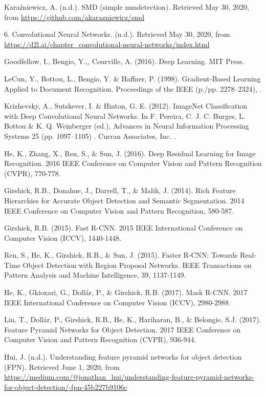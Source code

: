 \begin{thebibliography}{9}

\sloppy

Karaźniewicz, A. (n.d.).
SMD (simple mmdetection).
Retrieved May 30, 2020, from \url{https://github.com/akarazniewicz/smd}

6. Convolutional Neural Networks. (n.d.).
Retrieved May 30, 2020, from \url{https://d2l.ai/chapter_convolutional-neural-networks/index.html}

Goodfellow, I., Bengio, Y.,, Courville, A. (2016).
Deep Learning.
MIT Press. 

LeCun, Y., Bottou, L., Bengio, Y. \& Haffner, P. (1998).
Gradient-Based Learning Applied to Document Recognition.
Proceedings of the IEEE (p./pp. 2278--2324), . 

Krizhevsky, A., Sutskever, I. \& Hinton, G. E. (2012).
ImageNet Classification with Deep Convolutional Neural Networks.
In F. Pereira, C. J. C. Burges, L. Bottou \& K. Q. Weinberger (ed.),
Advances in Neural Information Processing Systems 25 (pp. 1097--1105) . Curran Associates, Inc. . 

He, K., Zhang, X., Ren, S., \& Sun, J. (2016).
Deep Residual Learning for Image Recognition.
2016 IEEE Conference on Computer Vision and Pattern Recognition (CVPR), 770-778.

Girshick, R.B., Donahue, J., Darrell, T., \& Malik, J. (2014).
Rich Feature Hierarchies for Accurate Object Detection and Semantic Segmentation.
2014 IEEE Conference on Computer Vision and Pattern Recognition, 580-587.

Girshick, R.B. (2015).
Fast R-CNN.
2015 IEEE International Conference on Computer Vision (ICCV), 1440-1448.

Ren, S., He, K., Girshick, R.B., \& Sun, J. (2015).
Faster R-CNN: Towards Real-Time Object Detection with Region Proposal Networks.
IEEE Transactions on Pattern Analysis and Machine Intelligence, 39, 1137-1149.

He, K., Gkioxari, G., Dollár, P., \& Girshick, R.B. (2017).
Mask R-CNN.
2017 IEEE International Conference on Computer Vision (ICCV), 2980-2988.

Lin, T., Dollár, P., Girshick, R.B., He, K., Hariharan, B., \& Belongie, S.J. (2017).
Feature Pyramid Networks for Object Detection.
2017 IEEE Conference on Computer Vision and Pattern Recognition (CVPR), 936-944.

Hui, J. (n.d.).
Understanding feature pyramid networks for object detection (FPN).
Retrieved June 1, 2020, from \url{https://medium.com/@jonathan_hui/understanding-feature-pyramid-networks-for-object-detection/-fpn-45b227b9106c}

\end{thebibliography}